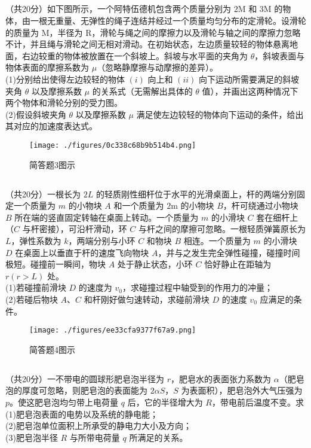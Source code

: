 \subsection{ }
（共20分）如下图所示，一个阿特伍德机包含两个质量分别为 $2\mathrm{M}$ 和 $3\mathrm{M}$ 的物体，由一根无重量、无弹性的绳子连结并经过一个质量均匀分布的定滑轮。设滑轮的质量为 $\mathrm{M}$，半径为 $\mathrm{R}$，滑轮与绳之间的摩擦力以及滑轮与轴之间的摩擦力忽略不计，并且绳与滑轮之间无相对滑动。在初始状态，左边质量较轻的物体悬离地面，右边较重的物体被放置在一个斜坡上。斜坡与水平面的夹角为 $\theta$，斜坡表面与物体表面的摩擦系数为 $\mu$（忽略静摩擦与动摩擦的差异）。\\
(1)分别给出使得左边较轻的物体 $(i)$ 向上和 $(ii)$ 向下运动所需要满足的斜坡夹角 $\theta$ 以及摩擦系数 $\mu$ 的关系式（无需解出具体的 $\theta$ 值），并画出这两种情况下两个物体和滑轮分别的受力图。\\
(2)假设斜坡夹角 $\theta$ 以及摩擦系数 $\mu$ 满足使左边较轻的物体向下运动的条件，给出其对应的加速度表达式。\\
\begin{figure}[ht]
\centering
\texttt{[image: ./figures/0c338c68b9b514b4.png]}
\caption{简答题3图示} \label{fig_CAS17_4}
\end{figure}
\subsection{ }
（共20分）一根长为 $2L$ 的轻质刚性细杆位于水平的光滑桌面上，杆的两端分别固定一个质量为 $m$ 的小物块 $A$ 和一个质量为 $2\mathrm{m}$ 的小物块 $B$，杆可绕通过小物块 $B$ 所在端的竖直固定转轴在桌面上转动。一个质量为 $m$ 的小滑块 $C$ 套在细杆上（$C$ 与杆密接），可沿杆滑动，环 $C$ 与杆之间的摩擦可忽略。一根轻质弹簧原长为 $L$，弹性系数为 $k$，两端分别与小环 $C$ 和物块 $B$ 相连。一个质量为 $m$ 的小滑块 $D$ 在桌面上以垂直于杆的速度飞向物块 $A$，并与之发生完全弹性碰撞，碰撞时间极短。碰撞前一瞬间，物块 $A$ 处于静止状态，小环 $C$ 恰好静止在距轴为 $r(r>L)$ 处。\\
(1)若碰撞前滑块 $D$ 的速度为 $v_{0}$，求碰撞过程中轴受到的作用力的冲量；\\
(2)若碰后物块 $A$、$C$ 和杆刚好做匀速转动，求碰前滑块 $D$ 的速度 $v_{0}$ 应满足的条件。\\
\begin{figure}[ht]
\centering
\texttt{[image: ./figures/ee33cfa9377f67a9.png]}
\caption{简答题4图示} \label{fig_CAS17_5}
\end{figure}
\subsection{ }
（共20分）一不带电的圆球形肥皂泡半径为 $r$，肥皂水的表面张力系数为 $\alpha$（肥皂泡的厚度可忽略，则肥皂泡的表面能为 $2 \alpha S$，$S$ 为表面积），肥皂泡外大气压强为 $p$。使这肥皂泡均匀带上电荷量 $q$ 后，它的半径增大为 $R$，带电前后温度不变。求\\
(1)肥皂泡表面的电势以及系统的静电能；\\
(2)肥皂泡单位面积上所承受的静电力大小及方向；\\
(3)肥皂泡半径 $R$ 与所带电荷量 $q$ 所满足的关系。\\
